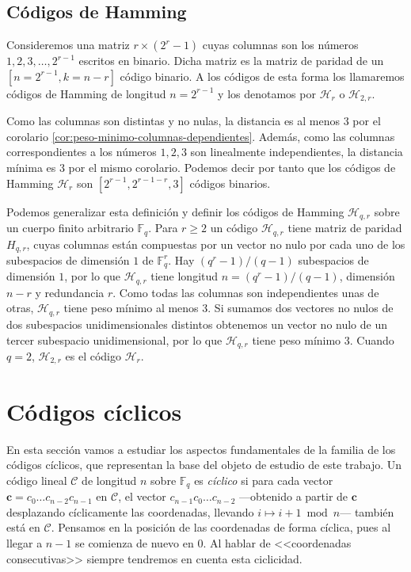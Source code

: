 \subsection{Códigos de Hamming}

Consideremos una matriz \(r \times (2^r - 1)\) cuyas columnas son los números \(1, 2, 3, \dots, 2^{r-1}\) escritos en binario. 
Dicha matriz es la matriz de paridad de un \([n=2^{r-1}, k=n-r]\) código binario.
A los códigos de esta forma los llamaremos códigos de Hamming de longitud \(n = 2^{r-1}\) y los denotamos por \(\mathcal H_r\) o \(\mathcal H_{2,r}\).

Como las columnas son distintas y no nulas, la distancia es al menos \(3\) por el corolario \ref{cor:peso-minimo-columnas-dependientes}.
Además, como las columnas correspondientes a los números \(1, 2, 3\) son linealmente independientes, la distancia mínima es 3 por el mismo corolario.
Podemos decir por tanto que los códigos de Hamming \(\mathcal H_r\) son \([2^{r-1}, 2^{r-1-r}, 3]\) códigos binarios.

Podemos generalizar esta definición y definir los códigos de Hamming \(\mathcal H_{q,r}\) sobre un cuerpo finito arbitrario \(\mathbb F_q\). 
Para \(r \geq 2\) un código \(\mathcal H_{q,r}\) tiene matriz de paridad \(H_{q,r}\), cuyas columnas están compuestas por un vector no nulo por cada uno de los subespacios de dimensión \(1\) de \(\mathbb F_q^r\).
Hay \((q^r-1)/(q-1)\) subespacios de dimensión \(1\), por lo que \(\mathcal H_{q,r}\) tiene longitud \(n = (q^r-1)/(q-1)\), dimensión \(n-r\) y redundancia \(r\).
Como todas las columnas son independientes unas de otras, \(\mathcal H_{q,r}\) tiene peso mínimo al menos 3.
Si sumamos dos vectores no nulos de dos subespacios unidimensionales distintos obtenemos un vector no nulo de un tercer subespacio unidimensional, por lo que \(\mathcal H_{q,r}\) tiene peso mínimo 3. 
Cuando \(q = 2\), \(\mathcal H_{2,r}\) es el código \(\mathcal H_r\).


\section{Códigos cíclicos}

En esta sección vamos a estudiar los aspectos fundamentales de la familia de los códigos cíclicos, que representan la base del objeto de estudio de este trabajo.
Un código lineal \(\mathcal C\) de longitud \(n\) sobre \(\mathbb F_q\) es \textit{cíclico} si para cada vector \(\mathbf c = c_0\dots c_{n-2}c_{n-1}\) en \(\mathcal C\), el vector \(c_{n-1}c_0\dots c_{n-2}\) —obtenido a partir de \(\mathbf c\) desplazando cíclicamente las coordenadas, llevando \(i \mapsto i +1 \bmod n\)— también está en \(\mathcal C\).
Pensamos en la posición de las coordenadas de forma cíclica, pues al llegar a \(n -1\) se comienza de nuevo en \(0\).
Al hablar de <<coordenadas consecutivas>> siempre tendremos en cuenta esta ciclicidad.

